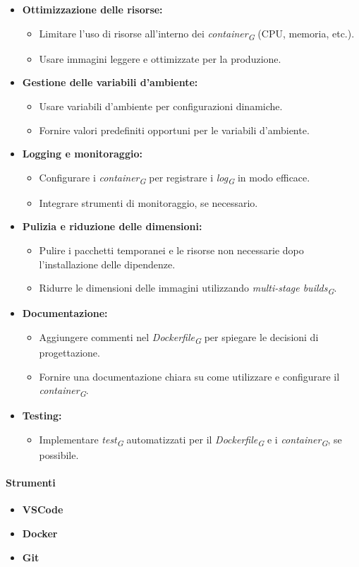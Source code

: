 \begin{itemize}
\item \textbf{Ottimizzazione delle risorse:}
    \begin{itemize}
        \item Limitare l'uso di risorse all'interno dei \textit{container}\textsubscript{\textit{G}} (CPU, memoria, etc.).
        \item Usare immagini leggere e ottimizzate per la produzione.
    \end{itemize}

\item \textbf{Gestione delle variabili d'ambiente:}
    \begin{itemize}
        \item Usare variabili d'ambiente per configurazioni dinamiche.
        \item Fornire valori predefiniti opportuni per le variabili d'ambiente.
    \end{itemize}

\item \textbf{Logging e monitoraggio:}
    \begin{itemize}
        \item Configurare i \textit{container}\textsubscript{\textit{G}} per registrare i \textit{log}\textsubscript{\textit{G}} in modo efficace.
        \item Integrare strumenti di monitoraggio, se necessario.
    \end{itemize}

\item \textbf{Pulizia e riduzione delle dimensioni:}
    \begin{itemize}
        \item Pulire i pacchetti temporanei e le risorse non necessarie dopo l'installazione delle dipendenze.
        \item Ridurre le dimensioni delle immagini utilizzando \textit{multi-stage builds}\textsubscript{\textit{G}}.
    \end{itemize}

\item \textbf{Documentazione:}
    \begin{itemize}
        \item Aggiungere commenti nel \textit{Dockerfile}\textsubscript{\textit{G}} per spiegare le decisioni di progettazione.
        \item Fornire una documentazione chiara su come utilizzare e configurare il \textit{container}\textsubscript{\textit{G}}.
    \end{itemize}

\item \textbf{Testing:}
    \begin{itemize}
        \item Implementare \textit{test}\textsubscript{\textit{G}} automatizzati per il \textit{Dockerfile}\textsubscript{\textit{G}} e i \textit{container}\textsubscript{\textit{G}}, se possibile.
    \end{itemize}
\end{itemize}
\paragraph{Strumenti}
\begin{itemize}
    \item \textbf{VSCode}
    \item \textbf{Docker}
    \item \textbf{Git}
\end{itemize}
